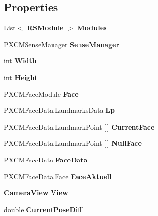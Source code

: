 \subsection*{Properties}
\begin{DoxyCompactItemize}
\item 
List$<$ \textbf{ R\+S\+Module} $>$ \textbf{ Modules}\hspace{0.3cm}{\ttfamily  [get]}
\item 
\mbox{\label{class_real_sense_1_1_model_a396ec458576859184ac7e39d9be13465}} 
P\+X\+C\+M\+Sense\+Manager {\bfseries Sense\+Manager}\hspace{0.3cm}{\ttfamily  [get, set]}
\item 
int \textbf{ Width}\hspace{0.3cm}{\ttfamily  [get]}
\item 
int \textbf{ Height}\hspace{0.3cm}{\ttfamily  [get]}
\item 
P\+X\+C\+M\+Face\+Module \textbf{ Face}\hspace{0.3cm}{\ttfamily  [get]}
\item 
P\+X\+C\+M\+Face\+Data.\+Landmarks\+Data \textbf{ Lp}\hspace{0.3cm}{\ttfamily  [get, set]}
\item 
\mbox{\label{class_real_sense_1_1_model_ad90fab8a6125b55803734ebbdcf1f83d}} 
P\+X\+C\+M\+Face\+Data.\+Landmark\+Point [$\,$] {\bfseries Current\+Face}\hspace{0.3cm}{\ttfamily  [get, set]}
\item 
P\+X\+C\+M\+Face\+Data.\+Landmark\+Point [$\,$] \textbf{ Null\+Face}\hspace{0.3cm}{\ttfamily  [get, set]}
\item 
P\+X\+C\+M\+Face\+Data \textbf{ Face\+Data}\hspace{0.3cm}{\ttfamily  [get, set]}
\item 
P\+X\+C\+M\+Face\+Data.\+Face \textbf{ Face\+Aktuell}\hspace{0.3cm}{\ttfamily  [get, set]}
\item 
\textbf{ Camera\+View} \textbf{ View}\hspace{0.3cm}{\ttfamily  [get, set]}
\item 
\mbox{\label{class_real_sense_1_1_model_a7a0873ddece63f5d3eb49f087771e9c6}} 
double {\bfseries Current\+Pose\+Diff}\hspace{0.3cm}{\ttfamily  [get, set]}
\item 
\mbox{\label{class_real_sense_1_1_model_a556c083ee213249d05c2383ffc8e46f4}} 

\end{DoxyCompactItemize}
